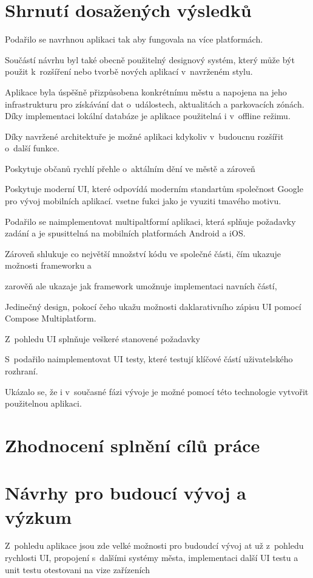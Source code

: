

\section{Shrnutí dosažených výsledků}
Podařilo se navrhnou aplikaci tak aby fungovala na více platformách.

Součástí návrhu byl také obecně použitelný designový systém, který může být použit k~rozšíření nebo tvorbě nových aplikací v~navrženém stylu.

Aplikace byla úspěšně přizpůsobena konkrétnímu městu a napojena na jeho infrastrukturu pro získávání dat o~událostech, 
aktualitách a parkovacích zónách. Díky implementaci lokální databáze je aplikace použitelná i v~offline režimu.

Díky navržené architektuře je možné aplikaci kdykoliv v~budoucnu rozšířit o~další funkce. 

Poskytuje občanů rychlí přehle o~aktálním dění ve městě a zároveň 

Poskytuje moderní UI, které odpovídá moderním standartům společnost Google pro vývoj mobilních aplikací.
vsetne fukci jako je vyuziti tmavého motivu.

Podařilo se naimplementovat multipaltformí aplikaci, která splňuje požadavky zadání a je spusittelná na mobilních 
platformách Android a iOS. 

Zároveň shlukuje co největší množství kódu ve společné části, čím ukazuje možnosti frameworku a 

zarověň ale ukazaje jak framework umožnuje implementaci navních částí, 

Jedinečný design, pokocí čeho ukažu možnosti daklarativního zápisu UI pomocí Compose Multiplatform.

Z~pohledu UI splnňuje veškeré stanovené požadavky

S~podařilo naimplementovat UI testy, které testují klíčové částí uživatelského rozhraní.

Ukázalo se, že i v~současné fázi vývoje je možné pomocí této technologie vytvořit použitelnou aplikaci.

\section{Zhodnocení splnění cílů práce}
\section{Návrhy pro budoucí vývoj a výzkum}
Z~pohledu aplikace jsou zde velké možnosti pro budoudcí vývoj 
at už z~pohledu rychlosti UI, propojení s~dalšími systémy města, implementaci další UI testu a unit testu
otestovani na vize zařízeních

